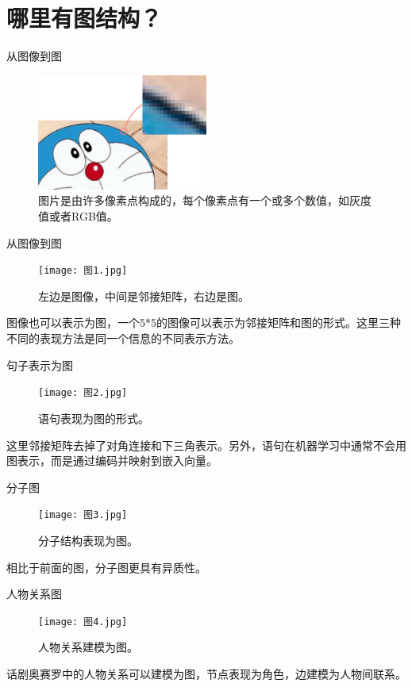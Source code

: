 \documentclass{beamer}
\begin{document}
\section{哪里有图结构？}

\begin{frame}{从图像到图}
    \begin{figure}
        \includegraphics[width=0.5\textwidth]{图片像素.jpg}
        \caption{图片是由许多像素点构成的，每个像素点有一个或多个数值，如灰度值或者RGB值。}
    \end{figure}
\end{frame}

\begin{frame}{从图像到图}
    \begin{figure}
        \texttt{[image: 图1.jpg]}
        \caption{左边是图像，中间是邻接矩阵，右边是图。}
    \end{figure}
    图像也可以表示为图，一个5*5的图像可以表示为邻接矩阵和图的形式。这里三种不同的表现方法是同一个信息的不同表示方法。
\end{frame}

\begin{frame}{句子表示为图}
    \begin{figure}
        \texttt{[image: 图2.jpg]}
        \caption{语句表现为图的形式。}
    \end{figure}
    这里邻接矩阵去掉了对角连接和下三角表示。另外，语句在机器学习中通常不会用图表示，而是通过编码并映射到嵌入向量。
\end{frame}

\begin{frame}{分子图}
    \begin{figure}
        \texttt{[image: 图3.jpg]}
        \caption{分子结构表现为图。}
    \end{figure}
    相比于前面的图，分子图更具有异质性。
\end{frame}

\begin{frame}{人物关系图}
    \begin{figure}
        \texttt{[image: 图4.jpg]}
        \caption{人物关系建模为图。}
    \end{figure}
    话剧奥赛罗中的人物关系可以建模为图，节点表现为角色，边建模为人物间联系。
\end{frame}
\end{document}
